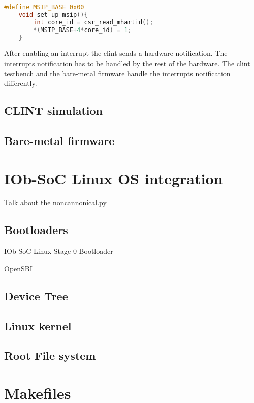 \begin{lstlisting}[language=C, caption={Set Up Software Interrupt.}, label=lst:set_up_msip]
    #define MSIP_BASE 0x00
    void set_up_msip(){
        int core_id = csr_read_mhartid();
        *(MSIP_BASE+4*core_id) = 1;
    }
\end{lstlisting}

After enabling an interrupt the \acrshort{clint} sends a hardware notification. The interrupts notification has to be handled by the rest of the hardware. The \acrshort{clint} testbench and the bare-metal firmware handle the interrupts notification differently.

\subsection{CLINT simulation}

\subsection{Bare-metal firmware}

\section{IOb-SoC Linux OS integration}
\label{section:linux_os_integration}
Talk about the noncannonical.py

\subsection{Bootloaders}
IOb-SoC Linux Stage 0 Bootloader

OpenSBI

\subsection{Device Tree}

\subsection{Linux kernel}

\subsection{Root File system}

\section{Makefiles}